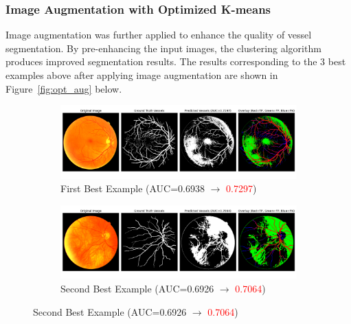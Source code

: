 \documentclass[12pt,letterpaper]{article}
\begin{document}
\subsubsection{Image Augmentation with Optimized K-means}
Image augmentation was further applied to enhance the quality of vessel segmentation. By pre-enhancing the input images, the clustering algorithm produces improved segmentation results. The results corresponding to the 3 best examples above after applying image augmentation are shown in Figure~\ref{fig:opt_aug} below. 
\begin{figure}[H]
    \centering
    \begin{subfigure}[H]{\textwidth}
        \centering
        \includegraphics[scale=0.35]{Figures/4 Optimized 1st.png}
        \vspace{-0.5cm}
        \caption{First Best Example (AUC=0.6938 $\rightarrow$ \textcolor{red}{0.7297})}
        \label{fig:opt_aug1}
    \end{subfigure}
    \begin{subfigure}[H]{\textwidth}
        \centering
        \includegraphics[scale=0.35]{Figures/4 Optimized 2nd.png}
        \vspace{-0.5cm}
        \caption{Second Best Example (AUC=0.6926 $\rightarrow$ \textcolor{red}{0.7064})}
        \label{fig:opt_aug2}
    \end{subfigure}
\end{figure}
\end{document}
